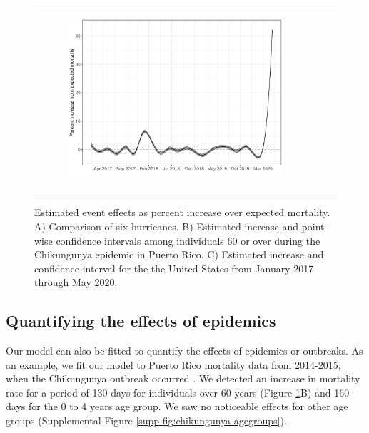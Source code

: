 \documentclass[11pt]{article}
\begin{document}
\begin{figure}[ht]
\begin{tabular}{lll}
\begin{subfigure}[t]{0.30\linewidth}
		\includegraphics[width=1\linewidth]{figs/figure-1c.pdf}
	\end{subfigure}\\
    \end{tabular}
    \caption{Estimated event effects as percent increase over expected mortality. A) Comparison of six hurricanes. B) Estimated increase and point-wise confidence intervals among individuals 60 or over during the Chikungunya epidemic in Puerto Rico. C) Estimated increase and confidence interval for the the United States from January 2017 through May 2020.}
    \label{fig:fhat-estimates}
\end{figure}

\subsection{Quantifying the effects of epidemics}
\label{subsec:epidemics}
Our model can also be fitted to quantify the effects of epidemics or outbreaks. As an example, we fit our model to Puerto Rico mortality data from 2014-2015, when the Chikungunya outbreak occurred \cite{sharp2016surveillance, hsu2019risk}. We detected an increase in mortality rate for a period of 130 days for individuals over 60 years (Figure \ref{fig:fhat-estimates}B) and 160 days for the 0 to 4 years age group. We saw no noticeable effects for other age groups (Supplemental Figure \ref{supp-fig:chikungunya-agegroups}).
\end{document}
